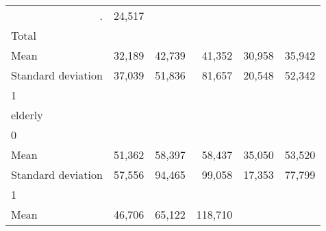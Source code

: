 \begin{tabular}{llllll}
  \multicolumn{1}{r}{.} &
  \multicolumn{1}{r}{24,517} \\
\multicolumn{1}{l}{\hspace{3em}Total} &
  \multicolumn{1}{|r}{} &
  \multicolumn{1}{r}{} &
  \multicolumn{1}{r}{} &
  \multicolumn{1}{r}{} &
  \multicolumn{1}{r}{} \\
\multicolumn{1}{l}{\hspace{4em}Mean} &
  \multicolumn{1}{|r}{32,189} &
  \multicolumn{1}{r}{42,739} &
  \multicolumn{1}{r}{41,352} &
  \multicolumn{1}{r}{30,958} &
  \multicolumn{1}{r}{35,942} \\
\multicolumn{1}{l}{\hspace{4em}Standard deviation} &
  \multicolumn{1}{|r}{37,039} &
  \multicolumn{1}{r}{51,836} &
  \multicolumn{1}{r}{81,657} &
  \multicolumn{1}{r}{20,548} &
  \multicolumn{1}{r}{52,342} \\
\multicolumn{1}{l}{\hspace{1em}1} &
  \multicolumn{1}{|r}{} &
  \multicolumn{1}{r}{} &
  \multicolumn{1}{r}{} &
  \multicolumn{1}{r}{} &
  \multicolumn{1}{r}{} \\
\multicolumn{1}{l}{\hspace{2em}elderly} &
  \multicolumn{1}{|r}{} &
  \multicolumn{1}{r}{} &
  \multicolumn{1}{r}{} &
  \multicolumn{1}{r}{} &
  \multicolumn{1}{r}{} \\
\multicolumn{1}{l}{\hspace{3em}0} &
  \multicolumn{1}{|r}{} &
  \multicolumn{1}{r}{} &
  \multicolumn{1}{r}{} &
  \multicolumn{1}{r}{} &
  \multicolumn{1}{r}{} \\
\multicolumn{1}{l}{\hspace{4em}Mean} &
  \multicolumn{1}{|r}{51,362} &
  \multicolumn{1}{r}{58,397} &
  \multicolumn{1}{r}{58,437} &
  \multicolumn{1}{r}{35,050} &
  \multicolumn{1}{r}{53,520} \\
\multicolumn{1}{l}{\hspace{4em}Standard deviation} &
  \multicolumn{1}{|r}{57,556} &
  \multicolumn{1}{r}{94,465} &
  \multicolumn{1}{r}{99,058} &
  \multicolumn{1}{r}{17,353} &
  \multicolumn{1}{r}{77,799} \\
\multicolumn{1}{l}{\hspace{3em}1} &
  \multicolumn{1}{|r}{} &
  \multicolumn{1}{r}{} &
  \multicolumn{1}{r}{} &
  \multicolumn{1}{r}{} &
  \multicolumn{1}{r}{} \\
\multicolumn{1}{l}{\hspace{4em}Mean} &
  \multicolumn{1}{|r}{46,706} &
  \multicolumn{1}{r}{65,122} &
  \multicolumn{1}{r}{118,710} &

\end{tabular}
